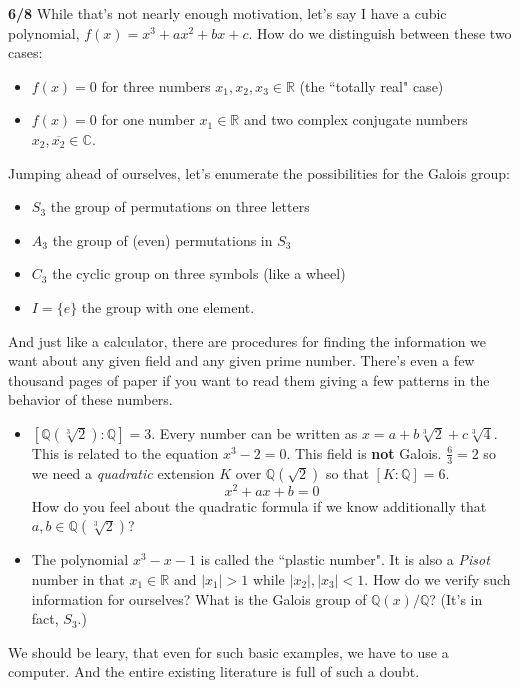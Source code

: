\documentclass[12pt]{article}
\begin{document}
\noindent \textbf{6/8} While that's not nearly enough motivation, let's say I have a cubic polynomial, $f(x) = x^3 + ax^2 + bx + c$.  How do we distinguish between these two cases:
\begin{itemize}
\item $f(x) = 0$ for three numbers $x_1, x_2, x_3  \in \mathbb{R}$ (the ``totally real" case)
\item $f(x) = 0$ for one number $x_1 \in \mathbb{R}$ and two complex conjugate numbers $x_2, \overline{x_2} \in \mathbb{C}$.
\end{itemize}
Jumping ahead of ourselves, let's enumerate the possibilities for the Galois group:
\begin{itemize}
\item $S_3$ the group of permutations on three letters
\item $A_3$ the group of (even) permutations in $S_3$
\item $C_3$ the cyclic group on three symbols (like a wheel)
\item $I = \{ e \}$ the group with one element.
\end{itemize}
And just like a calculator, there are procedures for finding the information we want about any given field and any given prime number.  There's even a few thousand pages of paper if you want to read them giving a few patterns in the behavior of these numbers.  
\begin{itemize}
\item $[\mathbb{Q}(\sqrt[3]{2}):\mathbb{Q}]= 3$.  Every number can be written as $x = a + b \sqrt[3]{2} + c \sqrt[3]{4}$.  This is related to the equation $x^3 - 2 = 0$. This field is \textbf{not} Galois.  $\frac{6}{3} = 2$ so we need a \textit{quadratic} extension $K$ over $\mathbb{Q}(\sqrt{2})$ so that $[K:\mathbb{Q}] = 6$.
$$ x^2 + ax + b = 0$$
How do you feel about the quadratic formula if we know additionally that $a,b \in \mathbb{Q}(\sqrt[3]{2})$? 
\item  The polynomial $x^3 - x - 1$ is called the ``plastic number".  It is also a \textit{Pisot} number in that $x_1 \in \mathbb{R}$ and $|x_1| > 1$ while $|x_2|, |x_3| < 1$.  How do we verify such information for ourselves?  What is the Galois group of $\mathbb{Q}(x)/\mathbb{Q}$?  (It's in fact, $S_3$.)
\end{itemize}
We should be leary, that even for such basic examples, we have to use a computer.  And the entire existing literature is full of such a doubt. \\ \\
\end{document}
